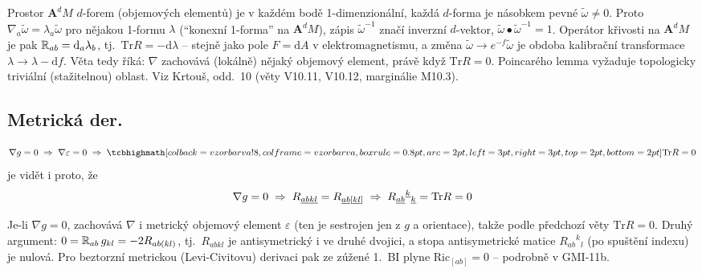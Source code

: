\begin{vysvetleni}
Prostor $\mathbf{A}^dM$ $d$-forem (objemových elementů) je v každém bodě 1-dimenzionální, každá $d$-forma je násobkem pevné $\tilde\omega\neq0$. Proto $\nabla_a\tilde\omega=\lambda_a\tilde\omega$ pro nějakou 1-formu $\lambda$ (``konexní 1-forma'' na $\mathbf{A}^dM$), zápis $\tilde\omega^{-1}$ značí inverzní $d$-vektor, $\tilde\omega\bullet\tilde\omega^{-1}=1$. Operátor křivosti na $\mathbf{A}^dM$ je pak $\mathbb{R}_{ab}=\mathrm{d}_a\lambda_b$, tj.\ $\mathrm{Tr}R=-\mathrm{d}\lambda$ -- stejně jako pole $F=\mathrm{d}A$ v elektromagnetismu, a změna $\tilde\omega\to e^{-f}\tilde\omega$ je obdoba kalibrační transformace $\lambda\to\lambda-\mathrm{d}f$.
Věta tedy říká: $\nabla$ zachovává (lokálně) nějaký objemový element, právě když $\mathrm{Tr}R=0$. Poincarého lemma vyžaduje topologicky triviální (stažitelnou) oblast. Viz Krtouš, odd.\ 10 (věty V10.11, V10.12, marginálie M10.3).
\end{vysvetleni}

\subsection*{Metrická der.}
\[
  \nabla g = 0 \;\Rightarrow\; \nabla\varepsilon = 0 \;\Rightarrow\; \vzorec{\mathrm{Tr}R = 0}
\]
je vidět i proto, že
\[
  \nabla g = 0 \;\Rightarrow\; R_{\underline{abkl}} = R_{\underline{ab}[\underline{kl}]}
  \;\Rightarrow\; R_{\underline{ab}}{}^{\underline{k}}{}_{\underline{k}} = \mathrm{Tr}R = 0
\]

\begin{vysvetleni}
Je-li $\nabla g=0$, zachovává $\nabla$ i metrický objemový element $\varepsilon$ (ten je sestrojen jen z $g$ a orientace), takže podle předchozí věty $\mathrm{Tr}R=0$. Druhý argument: $0=\mathbb{R}_{ab}\,g_{kl}=-2R_{ab(kl)}$, tj.\ $R_{abkl}$ je antisymetrický i ve druhé dvojici, a stopa antisymetrické matice $R_{ab}{}^{k}{}_{l}$ (po spuštění indexu) je nulová. Pro beztorzní metrickou (Levi-Civitovu) derivaci pak ze zúžené 1.\ BI plyne $\mathrm{Ric}_{[ab]}=0$ -- podrobně v GMI-11b.
\end{vysvetleni}

